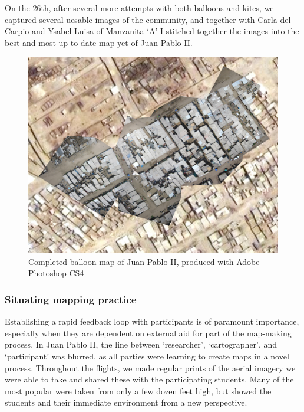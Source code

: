 \documentclass[11pt]{report}
\begin{document}
On the 26th, after several more attempts with both balloons and kites, we captured several uesable images of the community, and together with Carla del Carpio and Ysabel Luisa of Manzanita `A' I stitched together the images into the best and most up-to-date map yet of Juan Pablo II.  

\begin{figure}[h]
  \begin{center}
	\includegraphics[width=1\textwidth]{images/juan-pablo-final.jpg}
	\caption{Completed balloon map of Juan Pablo II, produced with Adobe Photoshop CS4}
  \end{center}
\end{figure}

\subsubsection{Situating mapping practice}

Establishing a rapid feedback loop with participants is of paramount importance, especially when they are dependent on external aid for part of the map-making process. In Juan Pablo II, the line between `researcher', `cartographer', and `participant' was blurred, as all parties were learning to create maps in a novel process. Throughout the flights, we made regular prints of the aerial imagery we were able to take and shared these with the participating students. Many of the most popular were taken from only a few dozen feet high, but showed the students and their immediate environment from a new perspective. 
\end{document}
